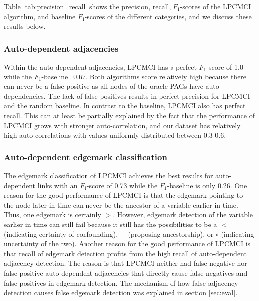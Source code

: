 \documentclass[conference]{IEEEtran}
\begin{document}
Table \ref{tab:precision_recall} shows the precision, recall, $F_1$-scores of the LPCMCI algorithm, and baseline $F_1$-scores of the different categories, and we discuss these results below.

\subsubsection{Auto-dependent adjacencies}
Within the auto-dependent adjacencies, LPCMCI has a perfect $F_1$-score of 1.0 while the $F_1$-baseline=0.67. Both algorithms score relatively high because there can never be a false positive as all nodes of the oracle PAGs have auto-dependencies. The lack of false positives results in perfect precision for LPCMCI and the random baseline.
In contrast to the baseline, LPCMCI also has perfect recall. This can at least be partially explained by the fact that the performance of LPCMCI grows with stronger auto-correlation\cite{gerhardus_high-recall_2021}, and our dataset has relatively high auto-correlations with values uniformly distributed between 0.3-0.6.

\subsubsection{Auto-dependent edgemark classification}
The edgemark classification of LPCMCI achieves the best results for auto-dependent links with an $F_1$-score of 0.73 while the $F_1$-baseline is only 0.26. One reason for the good performance of LPCMCI is that the edgemark pointing to the node later in time can never be the ancestor of a variable earlier in time. Thus, one edgemark is certainly $>$. 
However, edgemark detection of the variable earlier in time can still fail because it still has the possibilities to be a $<$ (indicating certainty of confounding), $-$ (proposing ancestorship), or $\circ$ (indicating uncertainty of the two).
Another reason for the good performance of LPCMCI is that recall of edgemark detection profits from the high recall of auto-dependent adjacency detection. The reason is that LPCMCI neither had false-negative nor false-positive auto-dependent adjacencies that directly cause false negatives and false positives in edgemark detection. The mechanism of how false adjacency detection causes false edgemark detection was explained in section \ref{sec:eval}.
\end{document}
